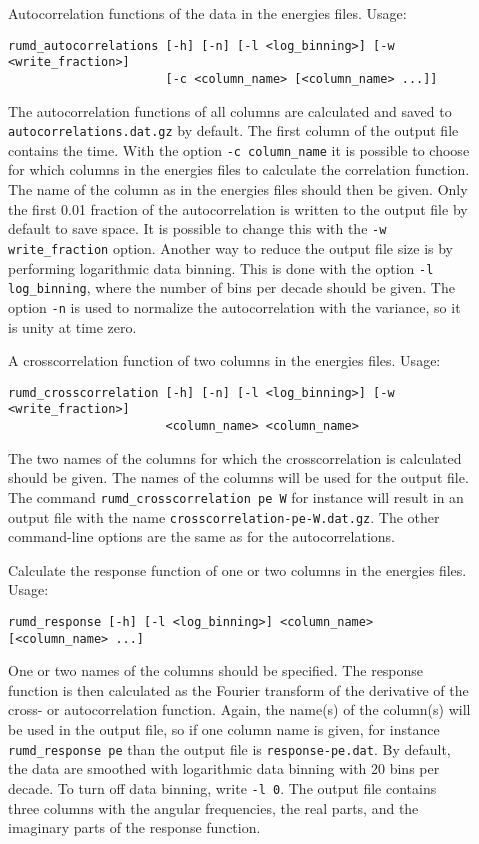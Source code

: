 \documentclass[a4paper]{article}
\begin{document}
\begin{description}
\item[] Autocorrelation functions of the data in the energies files. Usage:
\begin{verbatim}
rumd_autocorrelations [-h] [-n] [-l <log_binning>] [-w <write_fraction>]
                      [-c <column_name> [<column_name> ...]]
\end{verbatim}
The autocorrelation functions of all columns are calculated and saved to \verb|autocorrelations.dat.gz| by default. The first column of the output file contains the time. With the option \verb|-c column_name| it is possible to choose for which columns in the energies files to calculate the correlation function. The name of the column as in the energies files should then be given. Only the first 0.01 fraction of the autocorrelation is written to the output file by default to save space. It is possible to change this with the \verb|-w write_fraction| option. Another way to reduce the output file size is by performing logarithmic data binning. This is done with the option \verb|-l log_binning|, where the number of bins per decade should be given. The option \verb|-n| is used to normalize the autocorrelation with the variance, so it is unity at time zero.

\item[] A crosscorrelation function of two columns in the energies files. Usage:
\begin{verbatim}
rumd_crosscorrelation [-h] [-n] [-l <log_binning>] [-w <write_fraction>]
                      <column_name> <column_name>
\end{verbatim}
The two names of the columns for which the crosscorrelation is calculated should be given. The names of the columns will be used for the output file. The command \verb|rumd_crosscorrelation pe W| for instance will result in an output file with the name \verb|crosscorrelation-pe-W.dat.gz|. The other command-line options are the same as for the autocorrelations.

\item[] Calculate the response function of one or two columns in the energies files. Usage:
\begin{verbatim}
rumd_response [-h] [-l <log_binning>] <column_name> [<column_name> ...]
\end{verbatim}
One or two names of the columns should be specified. The response function is then calculated as the Fourier transform of the derivative of the cross- or autocorrelation function. Again, the name(s) of the column(s) will be used in the output file, so if one column name is given, for instance \verb|rumd_response pe| than the output file is \verb|response-pe.dat|. By default, the data are smoothed with logarithmic data binning with 20 bins per decade. To turn off data binning, write \verb|-l 0|. The output file contains three columns with the angular frequencies, the real parts, and the imaginary parts of the response function.
\end{description}
\end{document}
